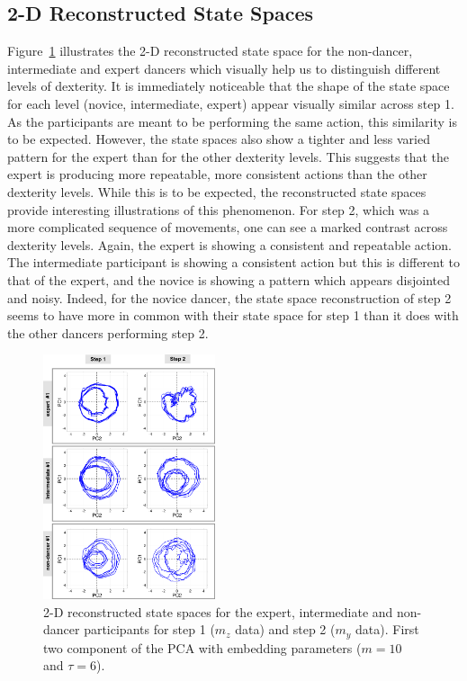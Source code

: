 \documentclass[10pt,journal,compsoc]{IEEEtran}
\begin{document}
\subsection{2-D Reconstructed State Spaces}

Figure~\ref{fig:skills} illustrates the 2-D reconstructed state space for the 
non-dancer, intermediate and expert dancers which visually help us to distinguish different levels of dexterity. 
It is immediately noticeable that the shape of the state space for each level (novice, intermediate, expert) 
appear visually similar across step 1.  
As the participants are meant to be performing the same action, this similarity is to be expected.  
However, the state spaces also show a tighter and less varied pattern for the expert than for the other dexterity levels.  
This suggests that the expert is producing more repeatable, more consistent actions than the other dexterity levels.  
While this is to be expected, the reconstructed state spaces provide interesting illustrations of this phenomenon.  
For step 2, which was a more complicated sequence of movements,
one can see a marked contrast across dexterity levels.  
Again, the expert is showing a consistent and repeatable action.  
The intermediate participant is showing a consistent action but this is different to that of the expert, 
and the novice is showing a pattern which appears disjointed and noisy.  
Indeed, for the novice dancer, the state space reconstruction of step 2 seems to have more in common 
with their state space for step 1 than it does with the other dancers performing step 2.  
\begin{figure}[!htb]
  \centering
  \includegraphics[width=0.45\textwidth]{rss00}
  \caption[PA]{2-D reconstructed state spaces for the expert, intermediate and
  non-dancer participants for step 1 ($m_z$ data) and step 2 ($m_y$ data).
  First two component of the PCA with embedding parameters ($m = 10$ and $\tau = 6$).}
  \label{fig:skills}
\end{figure}
\end{document}
